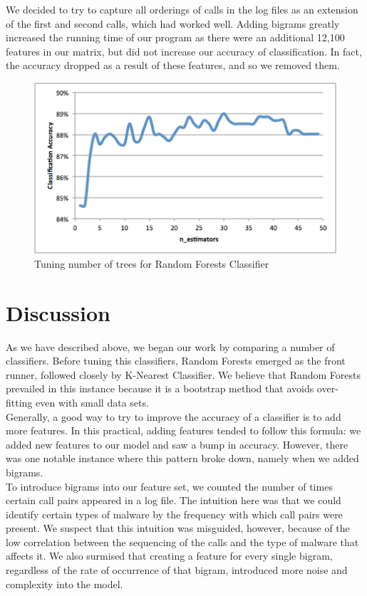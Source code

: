 \documentclass[11pt]{article}
\begin{document}
We decided to try to capture all orderings of calls in the log files as an extension of the first and second calls, which had worked well.  Adding bigrams greatly increased the running time of our program as there were an additional 12,100 features in our matrix, but did not increase our accuracy of classification.  In fact, the accuracy dropped as a result of these features, and so we removed them.

\begin{figure}[t]
\centering
\includegraphics[width=12cm]{n_estimators_tuning}
\caption{Tuning number of trees for Random Forests Classifier}
\label{fig:n_estimators_tuning}

\end{figure}

\section{Discussion}

As we have described above, we began our work by comparing a number of classifiers.  Before tuning this classifiers, Random Forests emerged as the front runner, followed closely by K-Nearest Classifier.  We believe that Random Forests prevailed in this instance because it is a bootstrap method that avoids over-fitting even with small data sets.\\

Generally, a good way to try to improve the accuracy of a classifier is to add more features.  In this practical, adding features tended to follow this formula: we added new features to our model and saw a bump in accuracy.  However, there was one notable instance where this pattern broke down, namely when we added bigrams.\\

To introduce bigrams into our feature set, we counted the number of times certain call pairs appeared in a log file. The intuition here was that we could identify certain types of malware by the frequency with which call pairs were present. We suspect that this intuition was misguided, however, because of the low correlation between the sequencing of the calls and the type of malware that affects it. We also surmised that creating a feature for every single bigram, regardless of the rate of occurrence of that bigram, introduced more noise and complexity into the model. \\
\end{document}

